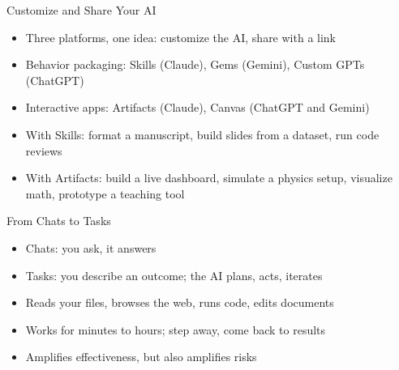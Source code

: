 \documentclass[aspectratio=169]{beamer}
\begin{document}
\begin{frame}{Customize and Share Your AI}
    \begin{itemize}
        \item Three platforms, one idea: customize the AI, share with a link
        \vspace{0.4em}
        \item Behavior packaging: Skills (Claude), Gems (Gemini), Custom GPTs (ChatGPT)
        \vspace{0.4em}
        \item Interactive apps: Artifacts (Claude), Canvas (ChatGPT and Gemini)
        \vspace{0.4em}
        \item With Skills: format a manuscript, build slides from a dataset, run code reviews
        \vspace{0.4em}
        \item With Artifacts: build a live dashboard, simulate a physics setup, visualize math, prototype a teaching tool
    \end{itemize}
\end{frame}


\begin{frame}{From Chats to Tasks}
    \begin{itemize}
        \item Chats: you ask, it answers
        \vspace{0.6em}
        \item Tasks: you describe an outcome; the AI plans, acts, iterates
        \vspace{0.6em}
        \item Reads your files, browses the web, runs code, edits documents
        \vspace{0.6em}
        \item Works for minutes to hours; step away, come back to results
        \vspace{0.6em}
        \item Amplifies effectiveness, but also amplifies risks
    \end{itemize}
\end{frame}
\end{document}
